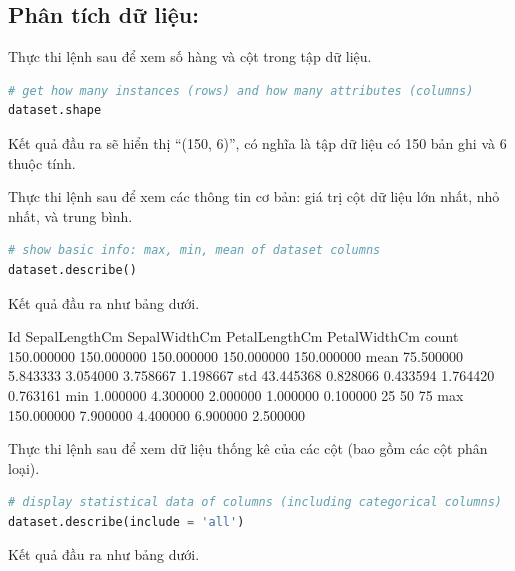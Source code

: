 \subsection{Phân tích dữ liệu:}

Thực thi lệnh sau để xem số hàng và cột trong tập dữ liệu.

\begin{lstlisting}[language=Python]
# get how many instances (rows) and how many attributes (columns)
dataset.shape
\end{lstlisting}

Kết quả đầu ra sẽ hiển thị \enquote{(150, 6)}, có nghĩa là tập dữ liệu
có 150 bản ghi và 6 thuộc tính.

Thực thi lệnh sau để xem các thông tin cơ bản:
giá trị cột dữ liệu lớn nhất, nhỏ nhất, và trung bình.

\begin{lstlisting}[language=Python]
# show basic info: max, min, mean of dataset columns
dataset.describe()
\end{lstlisting}

Kết quả đầu ra như bảng dưới.

\begin{terminal}
      Id         SepalLengthCm SepalWidthCm PetalLengthCm PetalWidthCm
count 150.000000 150.000000    150.000000   150.000000    150.000000
mean  75.500000  5.843333      3.054000     3.758667      1.198667
std   43.445368  0.828066      0.433594     1.764420      0.763161
min   1.000000   4.300000      2.000000     1.000000      0.100000
25%
50%
75%
max   150.000000 7.900000      4.400000     6.900000      2.500000
\end{terminal}

Thực thi lệnh sau để xem dữ liệu thống kê của các cột (bao gồm các cột phân loại).

\begin{lstlisting}[language=Python]
# display statistical data of columns (including categorical columns)
dataset.describe(include = 'all')
\end{lstlisting}

Kết quả đầu ra như bảng dưới.

